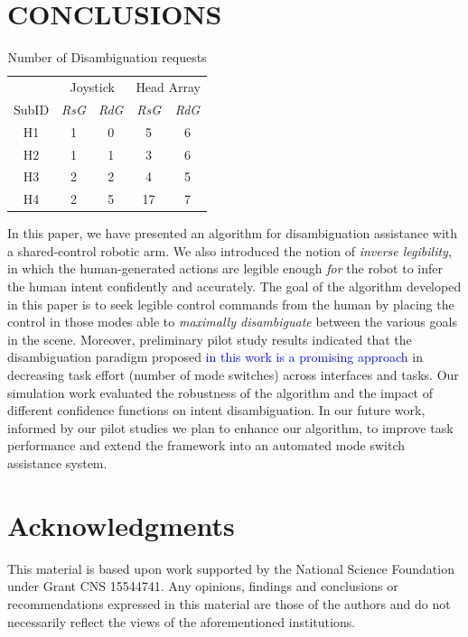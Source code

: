 \documentclass[conference]{IEEEtran}
\begin{document}
\section{CONCLUSIONS}\label{DC}
\begin{table}[t]
	\centering
	\begin{tabular}{ccccc}
		\toprule
		&\multicolumn{2}{c}{Joystick}
		&
		\multicolumn{2}{c}{Head Array} \\\cmidrule(r){2-3}\cmidrule(l){4-5}
		SubID &\textit{RsG}& \textit{RdG}    & \textit{RsG} &\textit{RdG}      \\
		\bottomrule
		H1 &1& 0   & 5 & 6  \\
		\bottomrule
		H2 &1& 1    & 3 & 6      \\
		\bottomrule
		H3 &2& 2    & 4 &5    \\
		\bottomrule
		H4 &2& 5    & 17 &7   \\
		\bottomrule
	\end{tabular}
	\vspace{.2cm}
	\caption{Number of Disambiguation requests}
	\label{ONDEMAND}
\end{table}
In this paper, we have presented an algorithm for disambiguation assistance with a shared-control robotic arm. We also introduced the notion of \textit{inverse legibility}, in which the human-generated actions are legible enough \textit{for} the robot to infer the human intent confidently and accurately. The goal of the algorithm developed in this paper is to seek legible control commands from the human by placing the control in those modes able to \textit{maximally disambiguate} between the various goals in the scene.  Moreover, preliminary pilot study results indicated that the disambiguation paradigm proposed \textcolor{blue}{in this work is a promising approach} in decreasing task effort (number of mode switches) across interfaces and tasks. Our simulation work evaluated the robustness of the algorithm and the impact of different confidence functions on intent disambiguation. In our future work, informed by our pilot studies we plan to enhance our algorithm, to improve task performance and extend the framework into an automated mode switch assistance system. 

\section*{Acknowledgments}
This material is based upon work supported by the National Science Foundation under Grant CNS 15544741. Any opinions, findings and conclusions or
recommendations expressed in this material are those of the authors and do
not necessarily reflect the views of the aforementioned institutions.
%
\end{document}
